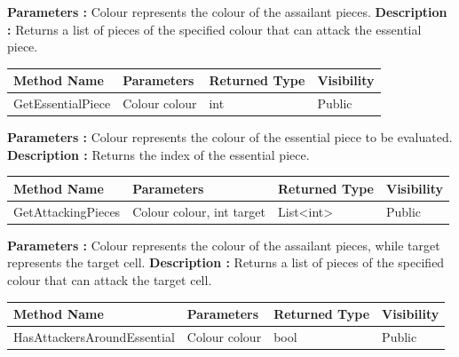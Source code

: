 \documentclass[12pt]{article}
\begin{document}
    \textbf{Parameters :} Colour represents the colour of the assailant pieces.
    \textbf{Description :} Returns a list of pieces of the specified colour that can attack the essential piece.

    \begin{table}[H]
        \begin{tabular}{|l|l|l|l|}
            \hline
            \rowcolor[HTML]{EFEFEF}
            \cellcolor[HTML]{EFEFEF}\textbf{Method Name} & \textbf{Parameters} & \textbf{Returned Type} & \textbf{Visibility} \\ \hline
            GetEssentialPiece                            & Colour colour       & int                    & Public              \\ \hline
        \end{tabular}
    \end{table}

    \textbf{Parameters :} Colour represents the colour of the essential piece to be evaluated.
    \textbf{Description :} Returns the index of the essential piece.

    \begin{table}[H]
        \begin{tabular}{|l|l|l|l|}
            \hline
            \rowcolor[HTML]{EFEFEF}
            \cellcolor[HTML]{EFEFEF}\textbf{Method Name} & \textbf{Parameters}       & \textbf{Returned Type} & \textbf{Visibility} \\ \hline
            GetAttackingPieces                           & Colour colour, int target & List\textless{}int\textgreater{} & Public              \\ \hline
        \end{tabular}
    \end{table}

    \textbf{Parameters :} Colour represents the colour of the assailant pieces, while target represents the target cell.
    \textbf{Description :} Returns a list of pieces of the specified colour that can attack the target cell.

    \begin{table}[H]
        \begin{tabular}{|l|l|l|l|}
            \hline
            \rowcolor[HTML]{EFEFEF}
            \cellcolor[HTML]{EFEFEF}\textbf{Method Name} & \textbf{Parameters} & \textbf{Returned Type} & \textbf{Visibility} \\ \hline
            HasAttackersAroundEssential                  & Colour colour       & bool                   & Public              \\ \hline
        \end{tabular}
    \end{table}
\end{document}
